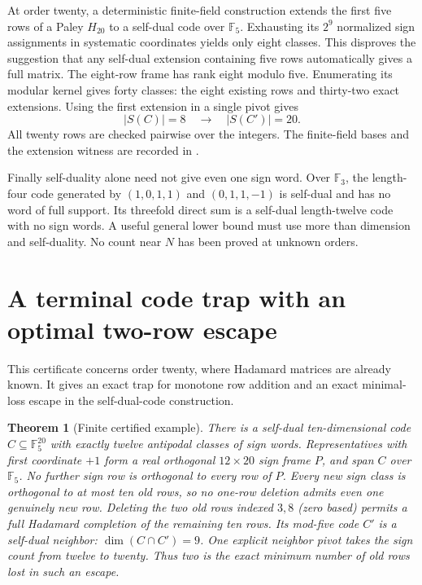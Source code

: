 \documentclass[11pt]{article}
\newtheorem{theorem}{Theorem}[section]
\begin{document}
At order twenty, a deterministic finite-field construction extends
the first five rows of a Paley $H_{20}$ to a self-dual code over
$\mathbb F_5$. Exhausting its $2^9$ normalized sign assignments in
systematic coordinates yields only eight classes. This disproves
the suggestion that any self-dual extension containing five rows
automatically gives a full matrix. The eight-row frame has rank
eight modulo five. Enumerating its modular kernel gives forty
classes: the eight existing rows and thirty-two exact extensions.
Using the first extension in a single pivot gives
\[
             |S(C)|=8\quad\longrightarrow\quad |S(C')|=20.
\]
All twenty rows are checked pairwise over the integers.
The finite-field bases and the extension witness are recorded in
.

Finally self-duality alone need not give even one sign word.
Over $\mathbb F_3$, the length-four code generated by
$(1,0,1,1)$ and $(0,1,1,-1)$ is self-dual and has no word of full
support. Its threefold direct sum is a self-dual length-twelve code
with no sign words. A useful general lower bound must use more than
dimension and self-duality. No count near $N$ has been proved at
unknown orders.
\section{A terminal code trap with an optimal two-row escape}

This certificate concerns order twenty, where Hadamard matrices are
already known. It gives an exact trap for monotone row addition and
an exact minimal-loss escape in the self-dual-code construction.

\begin{theorem}[Finite certified example]
There is a self-dual ten-dimensional code $C\subseteq\mathbb F_5^{20}$
with exactly twelve antipodal classes of sign words. Representatives
with first coordinate $+1$ form a real orthogonal $12\times20$ sign
frame $P$, and span $C$ over $\mathbb F_5$.
No further sign row is orthogonal to every row of $P$.
Every new sign class is orthogonal to at most ten old rows, so no
one-row deletion admits even one genuinely new row.
Deleting the two old rows indexed $3,8$ (zero based) permits a full
Hadamard completion of the remaining ten rows. Its mod-five code
$C'$ is a self-dual neighbor: $\dim(C\cap C')=9$.
One explicit neighbor pivot takes the sign count from twelve to twenty.
Thus two is the exact minimum number of old rows lost in such an escape.
\end{theorem}
\end{document}
